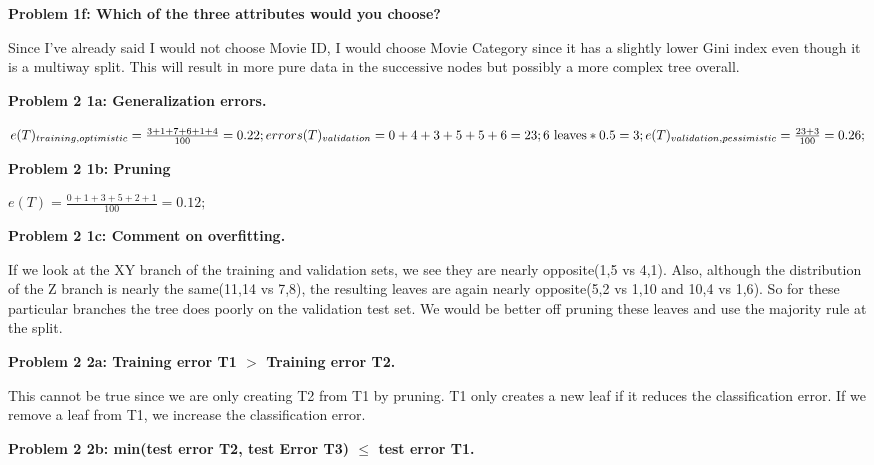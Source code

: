 \documentclass[11pt]{article}
\numberwithin{equation}{section}  %
\begin{document}
\noindent\textbf{Problem 1f: Which of the three attributes would you choose?}
\vspace*{0.25in}

\noindent Since I've already said I would not choose Movie ID, I would choose Movie Category since it has a slightly lower Gini index even though it is a multiway split. This will result in more pure data in the successive nodes but possibly a more complex tree overall.
\vspace*{0.25in}

\noindent\textbf{Problem 2 1a: Generalization errors.}
\vspace*{0.25in}

$e(T)_{training,optimistic}=\frac{3+1+7+6+1+4}{100}=0.22; \\
\\
errors(T)_{validation}=0+4+3+5+5+6=23; \\
6 \text{ leaves} * 0.5 = 3; \\
e(T)_{validation,pessimistic}=\frac{23+3}{100}=0.26;$
\vspace*{0.25in}

\noindent\textbf{Problem 2 1b: Pruning}
\vspace*{0.25in}

$e(T)=\frac{0+1+3+5+2+1}{100}=0.12;$
\vspace*{0.25in}

\noindent\textbf{Problem 2 1c: Comment on overfitting.}
\vspace*{0.25in}

If we look at the XY branch of the training and validation sets, we see they are nearly opposite({1,5} vs {4,1}). Also, although the distribution of the Z branch is nearly the same({11,14} vs {7,8}), the resulting leaves are again nearly opposite({5,2} vs {1,10} and {10,4} vs {1,6}). So for these particular branches the tree does poorly on the validation test set. We would be better off pruning these leaves and use the majority rule at the split.
\vspace*{0.25in}

\noindent\textbf{Problem 2 2a: Training error T1 $>$ Training error T2.}
\vspace*{0.25in}

This cannot be true since we are only creating T2 from T1 by pruning. T1 only creates a new leaf if it reduces the classification error. If we remove a leaf from T1, we increase the classification error.
\vspace*{0.25in}

\noindent\textbf{Problem 2 2b: min(test error T2, test Error T3) $\le$ test error T1.}
\vspace*{0.25in}
\end{document}
